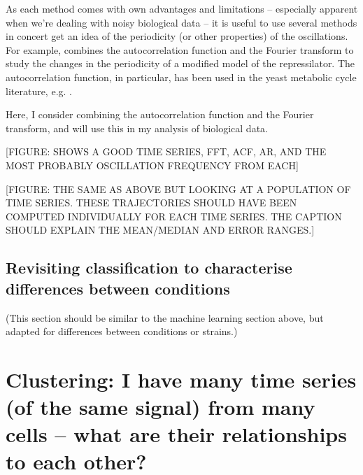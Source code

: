 As each method comes with own advantages and limitations -- especially apparent when we're dealing with noisy biological data -- it is useful to use several methods in concert get an idea of the periodicity (or other properties) of the oscillations.
For example, \textcite{potvin-trottierSynchronousLongtermOscillations2016} combines the autocorrelation function and the Fourier transform to study the changes in the periodicity of a modified model of the repressilator.
The autocorrelation function, in particular, has been used in the yeast metabolic cycle literature, e.g. \textcite{papagiannakisAutonomousMetabolicOscillations2017}.

Here, I consider combining the autocorrelation function and the Fourier transform, and will use this in my analysis of biological data.

[FIGURE: SHOWS A GOOD TIME SERIES, FFT, ACF, AR, AND THE MOST PROBABLY OSCILLATION FREQUENCY FROM EACH]

[FIGURE: THE SAME AS ABOVE BUT LOOKING AT A POPULATION OF TIME SERIES.  THESE TRAJECTORIES SHOULD HAVE BEEN COMPUTED INDIVIDUALLY FOR EACH TIME SERIES.  THE CAPTION SHOULD EXPLAIN THE MEAN/MEDIAN AND ERROR RANGES.]

\subsection{Revisiting classification to characterise differences between conditions}
\label{subsec:analysis-characterisation-classification_redux}

(This section should be similar to the machine learning section above, but adapted for differences between conditions or strains.)


\section{Clustering: I have many time series (of the same signal) from many cells -- what are their relationships to each other?}
\label{sec:analysis-clustering}


